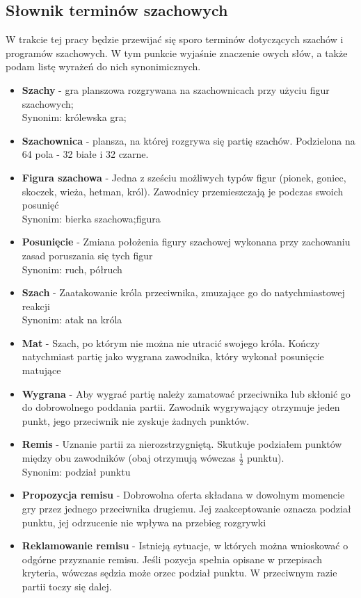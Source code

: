\documentclass[12pt,leqno]{article}
\begin{document}
\subsection{Słownik terminów szachowych}
W trakcie tej pracy będzie przewijać się sporo terminów dotyczących szachów i programów szachowych. W tym punkcie wyjaśnie znaczenie owych słów, a także podam listę wyrażeń do nich synonimicznych.
\begin{itemize}
\item {\bf Szachy} - gra planszowa rozgrywana na szachownicach przy użyciu figur szachowych; \\ Synonim: królewska gra;
\item {\bf Szachownica} - plansza, na której rozgrywa się partię szachów. Podzielona na 64 pola - 32 białe i 32 czarne. 
\item {\bf Figura szachowa} - Jedna z sześciu możliwych typów figur (pionek, goniec, skoczek, wieża, hetman, król). Zawodnicy przemieszczają je podczas swoich posunięć \\ Synonim: bierka szachowa;figura
\item {\bf Posunięcie} - Zmiana położenia figury szachowej wykonana przy zachowaniu zasad poruszania się tych figur \\ Synonim: ruch, półruch
\item {\bf Szach} - Zaatakowanie króla przeciwnika, zmuzające go do natychmiastowej reakcji \\ Synonim: atak na króla
\item {\bf Mat} - Szach, po którym nie można nie utracić swojego króla. Kończy natychmiast partię jako wygrana zawodnika, który wykonał posunięcie matujące
\item {\bf Wygrana} - Aby wygrać partię należy zamatować przeciwnika lub skłonić go do dobrowolnego poddania partii. Zawodnik wygrywający otrzymuje jeden punkt, jego przeciwnik nie zyskuje żadnych punktów.
\item {\bf Remis} - Uznanie partii za nierozstrzygniętą. Skutkuje podziałem punktów między obu zawodników (obaj otrzymują wówczas $\frac{1}{2}$ punktu).  \\ Synonim: podział punktu
\item {\bf Propozycja remisu} - Dobrowolna oferta składana w dowolnym momencie gry przez jednego przeciwnika drugiemu. Jej zaakceptowanie oznacza podział punktu, jej odrzucenie nie wpływa na przebieg rozgrywki
\item {\bf Reklamowanie remisu} - Istnieją sytuacje, w których można wnioskować o odgórne przyznanie remisu. Jeśli pozycja spełnia opisane w przepisach kryteria, wówczas sędzia może orzec podział punktu. W przeciwnym razie partii toczy się dalej.

\end{itemize}
\end{document}

